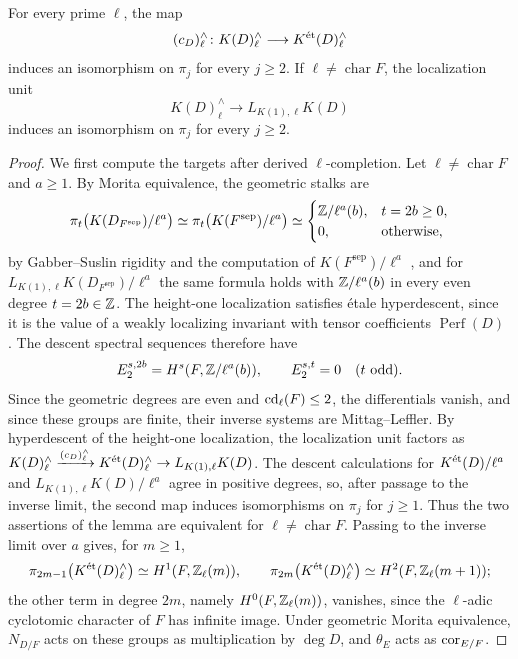 \begin{lemma}\label{lem:paper-local-complete-high}
For every prime $\ell$, the map
\[
 (c_D)^\wedge_\ell\colon K(D)^\wedge_\ell\longrightarrow K^{\mathrm{\acute et}}(D)^\wedge_\ell
\]
induces an isomorphism on $\pi_j$ for every $j\ge2$.
If $\ell\ne\operatorname{char}F$, the localization unit
\[
 K(D)^\wedge_\ell\longrightarrow L_{K(1),\ell}K(D)
\]
induces an isomorphism on $\pi_j$ for every $j\ge2$.
\end{lemma}
\begin{proof}
We first compute the targets after derived $\ell$-completion.
Let $\ell\ne\operatorname{char}F$ and $a\ge1$.
By Morita equivalence, the geometric stalks are
\[
 \pi_t\bigl(K(D_{F^{\mathrm{sep}}})/\ell^a\bigr)\simeq\pi_t\bigl(K(F^{\mathrm{sep}})/\ell^a\bigr)\simeq
 \begin{cases}
  \mathbb Z/\ell^a(b), & t=2b\ge0,\\
  0, & \text{otherwise},
 \end{cases}
\]
by Gabber--Suslin rigidity and the computation of $K(F^{\mathrm{sep}})/\ell^a$ \cite{SuslinClosed}, and for $L_{K(1),\ell}K(D_{F^{\mathrm{sep}}})/\ell^a$ the same formula holds with $\mathbb Z/\ell^a(b)$ in every even degree $t=2b\in\mathbb Z$.
The height-one localization satisfies \'etale hyperdescent, since it is the value of a weakly localizing invariant with tensor coefficients $\operatorname{Perf}(D)$ \cite[Example 5.12 and Theorem 7.14]{ClausenMathew}.
The descent spectral sequences therefore have
\[
 E_2^{s,2b}=H^s(F,\mathbb Z/\ell^a(b)),\qquad E_2^{s,t}=0\quad(t\text{ odd}).
\]
Since the geometric degrees are even and $\operatorname{cd}_\ell(F)\le2$, the differentials vanish, and since these groups are finite, their inverse systems are Mittag--Leffler.
By hyperdescent of the height-one localization, the localization unit factors as $K(D)^\wedge_\ell\xrightarrow{(c_D)^\wedge_\ell}K^{\mathrm{\acute et}}(D)^\wedge_\ell\to L_{K(1),\ell}K(D)$.
The descent calculations for $K^{\mathrm{\acute et}}(D)/\ell^a$ and $L_{K(1),\ell}K(D)/\ell^a$ agree in positive degrees, so, after passage to the inverse limit, the second map induces isomorphisms on $\pi_j$ for $j\ge1$.
Thus the two assertions of the lemma are equivalent for $\ell\ne\operatorname{char}F$.
Passing to the inverse limit over $a$ gives, for $m\ge1$,
\[
 \pi_{2m-1}\bigl(K^{\mathrm{\acute et}}(D)^\wedge_\ell\bigr)\simeq H^1(F,\mathbb Z_\ell(m)),\qquad
 \pi_{2m}\bigl(K^{\mathrm{\acute et}}(D)^\wedge_\ell\bigr)\simeq H^2(F,\mathbb Z_\ell(m+1));
\]
the other term in degree $2m$, namely $H^0(F,\mathbb Z_\ell(m))$, vanishes, since the $\ell$-adic cyclotomic character of $F$ has infinite image.
Under geometric Morita equivalence, $N_{D/F}$ acts on these groups as multiplication by $\deg D$, and $\theta_E$ acts as $\operatorname{cor}_{E/F}$.


\end{proof}
